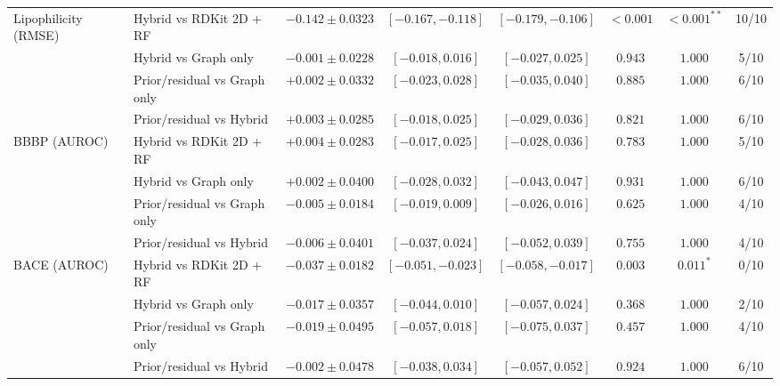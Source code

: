 \begin{table}[H]
\begin{tabular}{@{}llcccccc@{}}
\midrule
Lipophilicity (RMSE) & Hybrid vs RDKit 2D + RF & $-0.142\pm0.0323$ & $[-0.167,-0.118]$ & $[-0.179,-0.106]$ & $<0.001$ & $<0.001^{**}$ & 10/10 \\
 & Hybrid vs Graph only & $-0.001\pm0.0228$ & $[-0.018,0.016]$ & $[-0.027,0.025]$ & $0.943$ & $1.000$ & 5/10 \\
 & Prior/residual vs Graph only & $+0.002\pm0.0332$ & $[-0.023,0.028]$ & $[-0.035,0.040]$ & $0.885$ & $1.000$ & 6/10 \\
 & Prior/residual vs Hybrid & $+0.003\pm0.0285$ & $[-0.018,0.025]$ & $[-0.029,0.036]$ & $0.821$ & $1.000$ & 6/10 \\
\midrule
BBBP (AUROC) & Hybrid vs RDKit 2D + RF & $+0.004\pm0.0283$ & $[-0.017,0.025]$ & $[-0.028,0.036]$ & $0.783$ & $1.000$ & 5/10 \\
 & Hybrid vs Graph only & $+0.002\pm0.0400$ & $[-0.028,0.032]$ & $[-0.043,0.047]$ & $0.931$ & $1.000$ & 6/10 \\
 & Prior/residual vs Graph only & $-0.005\pm0.0184$ & $[-0.019,0.009]$ & $[-0.026,0.016]$ & $0.625$ & $1.000$ & 4/10 \\
 & Prior/residual vs Hybrid & $-0.006\pm0.0401$ & $[-0.037,0.024]$ & $[-0.052,0.039]$ & $0.755$ & $1.000$ & 4/10 \\
\midrule
BACE (AUROC) & Hybrid vs RDKit 2D + RF & $-0.037\pm0.0182$ & $[-0.051,-0.023]$ & $[-0.058,-0.017]$ & $0.003$ & $0.011^{*}$ & 0/10 \\
 & Hybrid vs Graph only & $-0.017\pm0.0357$ & $[-0.044,0.010]$ & $[-0.057,0.024]$ & $0.368$ & $1.000$ & 2/10 \\
 & Prior/residual vs Graph only & $-0.019\pm0.0495$ & $[-0.057,0.018]$ & $[-0.075,0.037]$ & $0.457$ & $1.000$ & 4/10 \\
 & Prior/residual vs Hybrid & $-0.002\pm0.0478$ & $[-0.038,0.034]$ & $[-0.057,0.052]$ & $0.924$ & $1.000$ & 6/10 \\
\bottomrule
\end{tabular}
\end{table}
